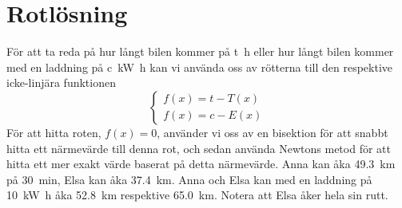 \documentclass[]{scrreprt}
\begin{document}
\section{Rotlösning}
För att ta reda på hur långt bilen kommer på \SI[number-math-rm = \mathnormal,parse-numbers=false]{t}{\hour}
eller hur långt bilen kommer med en laddning på \SI[number-math-rm = \mathnormal,parse-numbers=false]{c}{\kilo\watt\hour}
kan vi använda oss av rötterna till den respektive icke-linjära funktionen
\[
\begin{cases}
f(x) = t - T(x)\\
f(x) = c - E(x)
\end{cases}
\]
För att hitta roten, \(f(x) = 0\), använder vi oss av en bisektion för att snabbt hitta ett närmevärde till denna rot, och sedan använda Newtons metod för att hitta ett mer exakt värde baserat på detta närmevärde.
Anna kan åka \SI{49.3}{\kilo\meter} på \SI{30}{\minute}, Elsa kan åka \SI{37.4}{\kilo\meter}.
Anna och Elsa kan med en laddning på \SI{10}{\kilo\watt\hour} åka \SI{52.8}{\kilo\meter} respektive \SI{65.0}{\kilo\meter}. Notera att Elsa åker hela sin rutt.
\renewcommand{\appendixpagename}{Appendix}
\renewcommand{\appendixtocname}{Appendix}
\printbibliography
\end{document}
